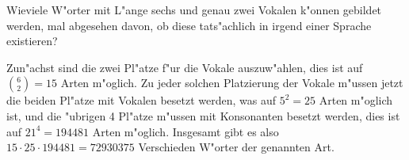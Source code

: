 Wieviele W"orter mit L"ange sechs und genau zwei Vokalen k"onnen
gebildet werden,
mal abgesehen davon, ob diese tats"achlich in irgend einer Sprache
existieren?

\begin{loesung}
Zun"achst sind die zwei Pl"atze f"ur die Vokale auszuw"ahlen, dies
ist auf $\binom{6}{2}=15$ Arten m"oglich. Zu jeder solchen Platzierung
der Vokale m"ussen jetzt die beiden Pl"atze mit Vokalen besetzt
werden, was auf $5^2=25$ Arten m"oglich ist, und die "ubrigen 4 Pl"atze
m"ussen mit Konsonanten besetzt werden, dies ist auf $21^4=194481$
Arten m"oglich.
Insgesamt gibt es also $15\cdot 25\cdot 194481=72930375$
Verschieden W"orter der genannten Art.
\end{loesung}

